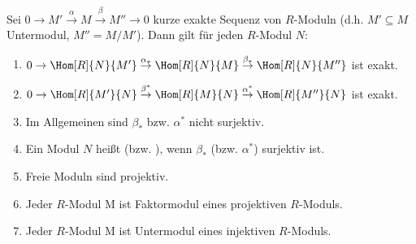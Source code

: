\begin{PropDef}
  Sei $0 \to M' \overset{\alpha}{\to} M \overset{\beta}{\to} M'' \to 0$ kurze exakte Sequenz von $R$-Moduln (d.h.
  $M' \subseteq M$ Untermodul, $M'' = M/M'$). Dann gilt für jeden $R$-Modul $N$:
  \begin{enumerate}
    \item $0 \to \Hom[R]{N}{M'} \overset{\alpha_*}{\to} \Hom[R]{N}{M} \overset{\beta_*}{\to}
          \Hom[R]{N}{M''}$ ist exakt.
    \item $0 \to \Hom[R]{M'}{N} \overset{\beta^*}{\to} \Hom[R]{M}{N} \overset{\alpha^*}{\to}
          \Hom[R]{M''}{N}$ ist exakt.
    \item Im Allgemeinen sind $\beta_*$ bzw. $\alpha^*$ nicht surjektiv.
    \item Ein Modul $N$ heißt  (bzw.
          ), wenn $\beta_*$ (bzw.
          $\alpha^*$) surjektiv ist.
    \item Freie Moduln sind projektiv.
    \item Jeder $R$-Modul M ist Faktormodul eines projektiven $R$-Moduls.
    \item Jeder $R$-Modul M ist Untermodul eines injektiven $R$-Moduls.
  \end{enumerate}
\end{PropDef}

